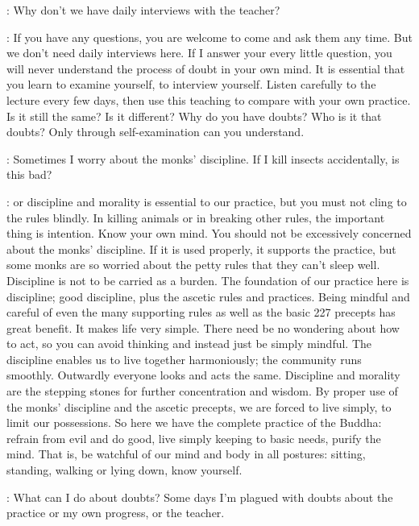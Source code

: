 :
Why don't we have daily interviews with the teacher?

: If you have any questions, you are welcome to come and ask them any time. But we don't need daily interviews here. If I answer your every little question, you will never understand the process of doubt in your own mind. It is essential that you learn to examine yourself, to interview yourself. Listen carefully to the lecture every few days, then use this teaching to compare with your own practice. Is it still the same? Is it different? Why do you have doubts? Who is it that doubts? Only through self-examination can you understand.

:
Sometimes I worry about the monks' discipline. If I kill insects accidentally, is this bad?

:  or discipline and morality is essential to our practice, but you must not cling to the rules blindly. In killing animals or in breaking other rules, the important thing is intention. Know your own mind. You should not be excessively concerned about the monks' discipline. If it is used properly, it supports the practice, but some monks are so worried about the petty rules that they can't sleep well. Discipline is not to be carried as a burden. The foundation of our practice here is discipline; good discipline, plus the ascetic rules and practices. Being mindful and careful of even the many supporting rules as well as the basic 227 precepts has great benefit. It makes life very simple. There need be no wondering about how to act, so you can avoid thinking and instead just be simply mindful. The discipline enables us to live together harmoniously; the community runs smoothly. Outwardly everyone looks and acts the same. Discipline and morality are the stepping stones for further concentration and wisdom. By proper use of the monks' discipline and the ascetic precepts, we are forced to live simply, to limit our possessions. So here we have the complete practice of the Buddha: refrain from evil and do good, live simply keeping to basic needs, purify the mind. That is, be watchful of our mind and body in all postures: sitting, standing, walking or lying down, know yourself.

:
What can I do about doubts? Some days I'm plagued with doubts about the practice or my own progress, or the teacher.

